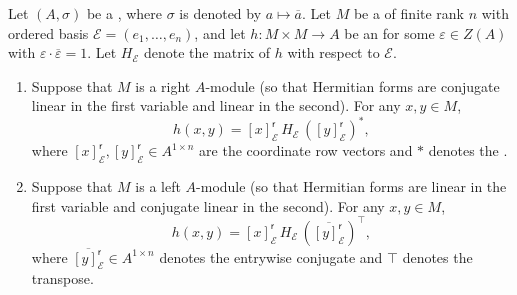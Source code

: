 \begin{lemma} \label{lemma:hermitian_form_evaluates_by_coordinate_row_vectors}
    Let $(A,\sigma)$ be a , where $\sigma$ is denoted by $a \mapsto \overline{a}$. Let $M$ be a  of finite rank $n$ with ordered basis $\mathcal{E} = (e_1,\ldots,e_n)$, and let $h: M \times M \to A$ be an  for some $\varepsilon \in Z(A)$ with $\varepsilon \cdot \overline{\varepsilon} = 1$. Let $H_\mathcal{E}$ denote the matrix of $h$ with respect to $\mathcal{E}$.

    \begin{enumerate}
        \item Suppose that $M$ is a right $A$-module (so that Hermitian forms are conjugate linear in the first variable and linear in the second). For any $x,y \in M$,
        $$h(x,y) = [x]_\mathcal{E}^{\mathsf{r}} \, H_\mathcal{E} \, ([y]_\mathcal{E}^{\mathsf{r}})^*,$$
        where $[x]_\mathcal{E}^{\mathsf{r}}, [y]_\mathcal{E}^{\mathsf{r}} \in A^{1 \times n}$ are the coordinate row vectors and $*$ denotes the .

        \item Suppose that $M$ is a left $A$-module (so that Hermitian forms are linear in the first variable and conjugate linear in the second). For any $x,y \in M$,
        $$h(x,y) = [x]_\mathcal{E}^{\mathsf{r}} \, H_\mathcal{E} \, (\overline{[y]_\mathcal{E}^{\mathsf{r}}})^\top,$$
        where $\overline{[y]_\mathcal{E}^{\mathsf{r}}} \in A^{1 \times n}$ denotes the entrywise conjugate and $\top$ denotes the transpose.
    \end{enumerate}
\end{lemma}

